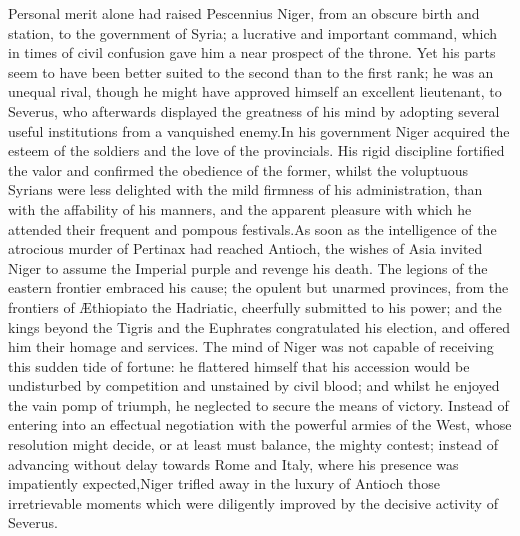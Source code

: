 




Personal merit alone had raised Pescennius Niger, from an obscure
birth and station, to the government of Syria; a lucrative and
important command, which in times of civil confusion gave him a
near prospect of the throne. Yet his parts seem to have been
better suited to the second than to the first rank; he was an
unequal rival, though he might have approved himself an excellent
lieutenant, to Severus, who afterwards displayed the greatness of
his mind by adopting several useful institutions from a
vanquished enemy.\footnotemark[21] In his government Niger acquired the esteem
of the soldiers and the love of the provincials. His rigid
discipline fortified the valor and confirmed the obedience of the
former, whilst the voluptuous Syrians were less delighted with
the mild firmness of his administration, than with the affability
of his manners, and the apparent pleasure with which he attended
their frequent and pompous festivals.\footnotemark[22] As soon as the
intelligence of the atrocious murder of Pertinax had reached
Antioch, the wishes of Asia invited Niger to assume the Imperial
purple and revenge his death. The legions of the eastern frontier
embraced his cause; the opulent but unarmed provinces, from the
frontiers of Æthiopia\footnotemark[23] to the Hadriatic, cheerfully submitted
to his power; and the kings beyond the Tigris and the Euphrates
congratulated his election, and offered him their homage and
services. The mind of Niger was not capable of receiving this
sudden tide of fortune: he flattered himself that his accession
would be undisturbed by competition and unstained by civil blood;
and whilst he enjoyed the vain pomp of triumph, he neglected to
secure the means of victory. Instead of entering into an
effectual negotiation with the powerful armies of the West, whose
resolution might decide, or at least must balance, the mighty
contest; instead of advancing without delay towards Rome and
Italy, where his presence was impatiently expected,\footnotemark[24] Niger
trifled away in the luxury of Antioch those irretrievable moments
which were diligently improved by the decisive activity of
Severus.\footnotemark[25]

